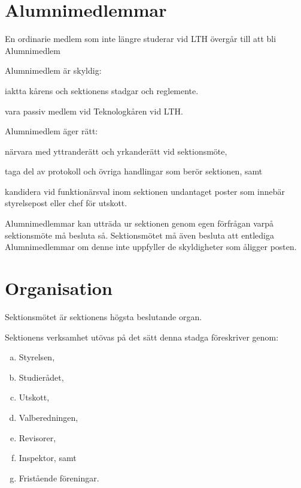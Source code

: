 \documentclass[stadgar]{dsekprotokoll}
\begin{document}
\section{Alumnimedlemmar}

\begin{stadgeavsnitt}

        En ordinarie medlem som inte längre
        studerar vid LTH övergår till att bli Alumnimedlem


Alumnimedlem är skyldig:
\begin{attlista}
        \item iaktta kårens och sektionens stadgar och reglemente.
        \item vara passiv medlem vid Teknologkåren vid LTH.
\end{attlista}


Alumnimedlem äger rätt:
\begin{attlista}
\item närvara med yttranderätt och yrkanderätt vid sektionsmöte,
\item taga del av protokoll och övriga handlingar som berör sektionen, samt
\item kandidera vid funktionärsval inom sektionen undantaget poster som
  innebär styrelsepost eller chef för utskott.
\end{attlista}

 Alumnimedlemmar kan utträda ur sektionen genom egen förfrågan varpå sektionsmöte må besluta så. Sektionsmötet må även besluta att entlediga Alumnimedlemmar om denne inte uppfyller de skyldigheter som åligger posten.

\end{stadgeavsnitt}

\section{Organisation}

\begin{stadgeavsnitt}


Sektionsmötet är sektionens högsta beslutande organ.


Sektionens verksamhet utövas på det sätt denna stadga föreskriver genom:
\begin{enumerate}[a)]
\item Styrelsen,
\item Studierådet,
\item Utskott,
\item Valberedningen,
\item Revisorer,
\item Inspektor, samt
\item Fristående föreningar.
\end{enumerate}

\end{stadgeavsnitt}
\end{document}

